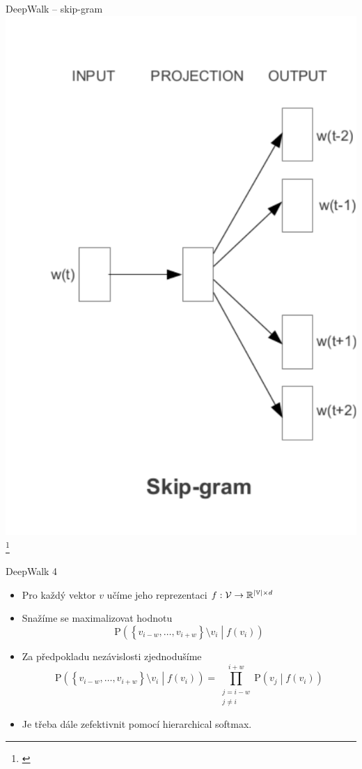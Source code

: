\documentclass[10pt]{beamer}
\newcommand{\mathspace}{\ensuremath{\mathcal}}
\newcommand{\mathfield}{\ensuremath{\mathbb}}
\begin{document}
\begin{frame}{DeepWalk -- skip-gram}
	\centering
	\includegraphics[width=0.4\pagewidth]{images/SkipGram.pdf}\footnote{\cite{mikolov_efficient_2013}}
\end{frame}

\begin{frame}{DeepWalk 4}
	\begin{itemize}
		\item Pro každý vektor \( v \) učíme jeho reprezentaci \( f : \mathspace{V} \to \mathfield{R}^{\left\lvert \mathfield{V} \right\rvert \times d} \)
		\item Snažíme se maximalizovat hodnotu
			\[ \mathrm{P} \left( \left\{ v_{i - w}, \dots, v_{i + w} \right\} \setminus v_i \middle| f \left( v_i \right) \right) \]
		\item Za předpokladu nezávislosti zjednodušíme
			\[ \mathrm{P} \left( \left\{ v_{i - w}, \dots, v_{i + w} \right\} \setminus v_i \middle| f \left( v_i \right) \right) = \prod_{\substack{j = i - w \\ j \neq i}}^{i + w} \mathrm{P} \left( v_j \middle| f \left( v_i \right) \right) \]
		\item Je třeba dále zefektivnit pomocí hierarchical softmax.
	\end{itemize}
\end{frame}
\end{document}

